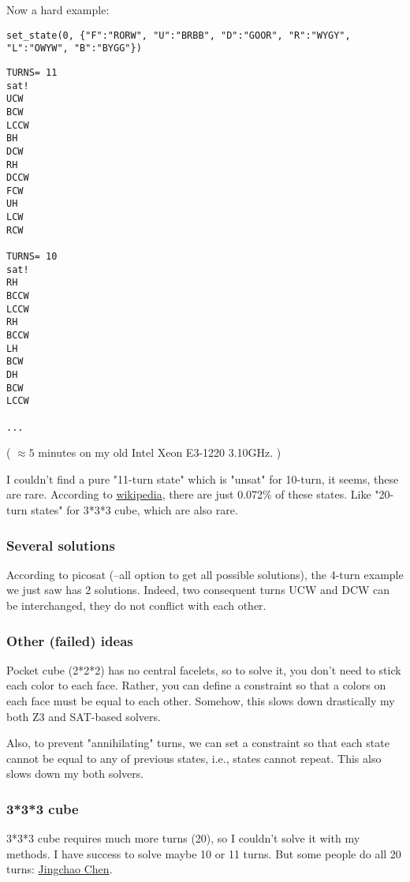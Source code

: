 Now a hard example:

\begin{lstlisting}
set_state(0, {"F":"RORW", "U":"BRBB", "D":"GOOR", "R":"WYGY", "L":"OWYW", "B":"BYGG"})
\end{lstlisting}

\begin{lstlisting}
TURNS= 11
sat!
UCW
BCW
LCCW
BH
DCW
RH
DCCW
FCW
UH
LCW
RCW

TURNS= 10
sat!
RH
BCCW
LCCW
RH
BCCW
LH
BCW
DH
BCW
LCCW

...
\end{lstlisting}

( $\approx 5$ minutes on my old Intel Xeon E3-1220 3.10GHz. )

I couldn't find a pure "11-turn state" which is "unsat" for 10-turn, it seems, these are rare.
According to \href{https://en.wikipedia.org/wiki/Pocket_Cube}{wikipedia}, there are just 0.072\% of these states.
Like "20-turn states" for 3*3*3 cube, which are also rare.

\subsubsection{Several solutions}

According to picosat (--all option to get all possible solutions), the 4-turn example we just saw has 2 solutions.
Indeed, two consequent turns UCW and DCW can be interchanged, they do not conflict with each other.

\subsubsection{Other (failed) ideas}

Pocket cube (2*2*2) has no central facelets, so to solve it, you don't need to stick each color to each face.
Rather, you can define a constraint so that a colors on each face must be equal to each other.
Somehow, this slows down drastically my both Z3 and SAT-based solvers.

Also, to prevent "annihilating" turns, we can set a constraint so that each state cannot be equal to any of previous
states, i.e., states cannot repeat.
This also slows down my both solvers.

\subsubsection{3*3*3 cube}

3*3*3 cube requires much more turns (20), so I couldn't solve it with my methods.
I have success to solve maybe 10 or 11 turns.
But some people do all 20 turns: \href{https://arxiv.org/pdf/1105.1436.pdf}{Jingchao Chen}.

